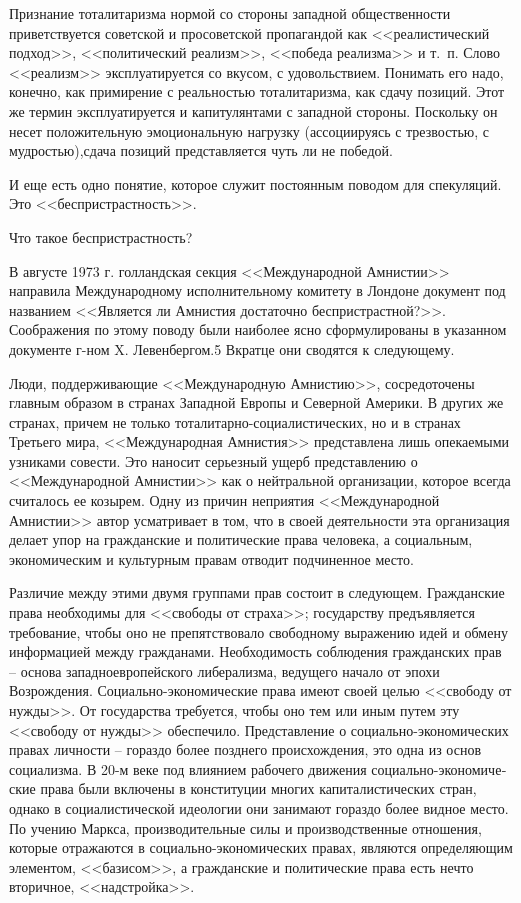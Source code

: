 \documentclass{book}
\begin{document}
Признание тоталитаризма нормой со стороны западной об­щественности приветствуется советской и просоветской про­пагандой как <<реалистический подход>>, <<политический реа­лизм>>, <<победа реализма>> и т.~п. Слово <<реализм>> эксплуати­руется со вкусом, с удовольствием. Понимать его надо, конеч­но, как примирение с реальностью тоталитаризма, как сдачу позиций. Этот же термин эксплуатируется и капитулянтами с западной стороны. Поскольку он несет положительную эмо­циональную нагрузку (ассоциируясь с трезвостью, с мудро­стью),сдача позиций представляется чуть ли не победой.

И еще есть одно понятие, которое служит постоянным пово­дом для спекуляций. Это <<беспристрастность>>.

Что такое беспристрастность?

В августе 1973 г. голландская секция <<Международной Ам­нистии>> направила Международному исполнительному комитету в Лондоне документ под названием <<Является ли Амнистия достаточно беспристрастной?>>. Соображения по этому поводу были наиболее ясно сформулированы в указанном документе г-ном X. Левенбергом.5 Вкратце они сводятся к следующему.

Люди, поддерживающие <<Международную Амнистию>>, сосре­доточены главным образом в странах Западной Европы и Се­верной Америки. В других же странах, причем не только тота­литарно-социалистических, но и в странах Третьего мира, <<Международная Амнистия>> представлена лишь опекаемыми узника­ми совести. Это наносит серьезный ущерб представлению о <<Международной Амнистии>> как о нейтральной организации, которое всегда считалось ее козырем. Одну из причин непри­ятия <<Международной Амнистии>> автор усматривает в том, что в своей деятельности эта организация делает упор на граждан­ские и политические права человека, а социальным, экономи­ческим и культурным правам отводит подчиненное место.

Различие между этими двумя группами прав состоит в сле­дующем. Гражданские права необходимы для <<свободы от страха>>; государству предъявляется требование, чтобы оно не препятствовало свободному выражению идей и обмену информацией между гражданами. Необходимость соблюде­ния гражданских прав -- основа западноевропейского либера­лизма, ведущего начало от эпохи Возрождения. Социально-экономические права имеют своей целью <<свободу от нуж­ды>>. От государства требуется, чтобы оно тем или иным пу­тем эту  <<свободу от нужды>> обеспечило. Представление о социально-экономических правах личности -- гораздо более позднего происхождения, это одна из основ социализма. В 20-м веке под влиянием рабочего движения социально-экономиче­ские права были включены в конституции многих капиталисти­ческих стран, однако в социалистической идеологии они зани­мают гораздо более видное место. По учению Маркса, произ­водительные силы и производственные отношения, которые отражаются в социально-экономических правах, являются 
определяющим 
элементом, <<базисом>>, а гражданские и поли­тические права есть нечто вторичное, <<надстройка>>.
\end{document}
